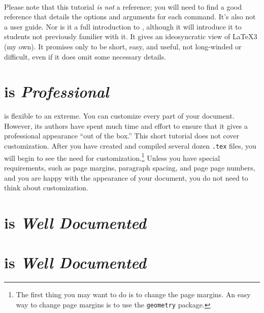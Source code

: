 \documentclass[letterpaper]{article}
\begin{document}
    \paragraph{}Please note that this tutorial \textit{is not} a \LaTeXe{} reference; you will need to find a good reference that details the options and arguments for each command. It's also not a user guide. Nor is it a full introduction to \LaTeXe{}, although it will introduce it to students not previously familier with it. It gives an ideosyncratic view of \LaTeX3{} (my own). It promises only to be short, easy, and useful, not long-winded or difficult, even if it does omit some necessary details. 

    

    \section*{\LaTeXe{} is \textit{Professional}}

    \LaTeXe{} is flexible to an extreme. You can customize every part of your document. However, its authors have spent much time and effort to ensure that it gives a professional appearance ``out of the box.'' This short tutorial does not cover customization. After you have created and compiled several dozen \texttt{.tex} files, you will begin to see the need for customization.\footnote{The first thing you may want to do is to change the page margins. An easy way to change page margins is to use the \texttt{geometry} package.} Unless you have special requirements, such as page margins, paragraph spacing, and page page numbers, and you are happy with the appearance of your document, you do not need to think about customization.

    

    \section*{\LaTeXe{} is \textit{Well Documented}}

    

    \section*{\LaTeXe{} is \textit{Well Documented}}
\end{document}
